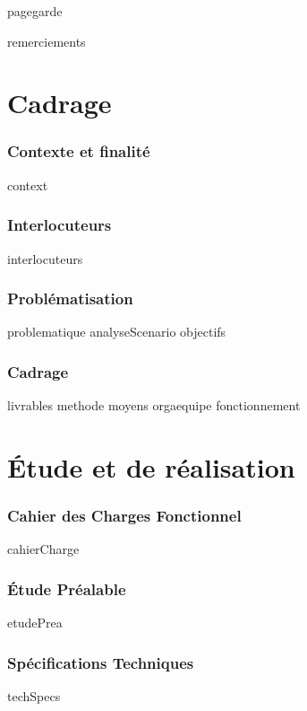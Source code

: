\documentclass[a4paper, 12pt, titlepage, oneside, french]{article}
\begin{document}
{pagegarde}
\newpage

\tableofcontents
\newpage

{remerciements}
\newpage

\part{Cadrage}
\section{Contexte et finalité}
{context}
\newpage

\section{Interlocuteurs}
{interlocuteurs}
\newpage

\section{Problématisation}
{problematique}
{analyseScenario}
{objectifs}
\newpage

\section{Cadrage}
{livrables}
{methode}
{moyens}
{orgaequipe}
{fonctionnement}
\newpage


\part{Étude et de réalisation}

\section{Cahier des Charges Fonctionnel}
{cahierCharge}
\newpage

\section{Étude Préalable}
{etudePrea}
\newpage

\section{Spécifications Techniques}
{techSpecs}
\newpage
\end{document}
